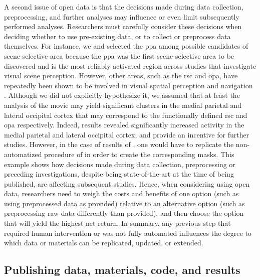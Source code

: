 A second issue of open data is that the decisions made during data collection,
preprocessing, and further analyses may influence or even limit subsequently
performed analyses.
%
Researchers must carefully consider these decisions when deciding whether to use
pre-existing data, or to collect or preprocess data themselves.
%
For instance, we and \citet{sengupta2016extension} selected the \ac{ppa} among
possible candidates of scene-selective area because the \ac{ppa} was the first
scene-selective area to be discovered and is the most reliably activated region
across studies that investigate visual scene perception.
%
However, other areas, such as the \ac{rsc} and \ac{opa}, have repeatedly been
shown to be involved in visual spatial perception and navigation
\citep{chrastil2018heterogeneity, bettencourt2013role, dilks2013occipital,
epstein2019scene}.
%
Although we did not explicitly hypothesize it, we assumed that at least the
analysis of the movie may yield significant clusters in the medial parietal and
lateral occipital cortex that may correspond to the functionally defined
\ac{rsc} and \ac{opa} respectively.
%
Indeed, results revealed significantly increased activity in the medial parietal
and lateral occipital cortex, and provide an incentive for further studies.
However, in the case of results of \citet{sengupta2016extension}, one would
have to replicate the non-automatized procedure of \citet{sengupta2016extension}
in order to create the corresponding masks.
%
This example shows how decisions made during data collection, preprocessing or
preceding investigations, despite being state-of-the-art at the time of being
published, are affecting subsequent studies.
Hence, when considering using open data, researchers need to weigh the costs and
benefits of one option (such as using preprocessed data as provided) relative to
an alternative option (such as preprocessing raw data differently than
provided), and then choose the option that will yield the highest net return.
%
In summary, any previous step that required human intervention or was not fully
automated influences the degree to which data or materials can be replicated,
updated, or extended.




\subsection{Publishing data, materials, code, and results}

